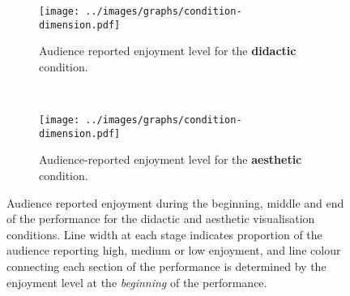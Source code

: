 \begin{figure}
\centering
\begin{subfigure}{\textwidth}
  \centering
  \texttt{[image: ../images/graphs/condition-dimension.pdf]}
  \caption[Didactic condition enjoyment detailed survey results]{Audience reported enjoyment level for the \textbf{didactic} condition.}
  \label{fig:didactic-enjoyment}
\end{subfigure}\\
\vspace{15mm}
\begin{subfigure}{\textwidth}
  \centering
  \texttt{[image: ../images/graphs/condition-dimension.pdf]}
  \caption[Aesthetic condition enjoyment detailed survey results]{Audience-reported enjoyment level for the \textbf{aesthetic} condition.}
  \label{fig:aesthetic-enjoyment}
\end{subfigure}
\vspace{15mm}
\caption[User study enjoyment survey responses]{Audience reported enjoyment during the beginning, middle and end of the performance for the didactic and aesthetic visualisation conditions. Line width at each stage indicates proportion of the audience reporting high, medium or low enjoyment, and line colour connecting each section of the performance is determined by the enjoyment level at the \emph{beginning} of the performance.}
\label{fig:user-study-condition-enjoyment}
\end{figure}